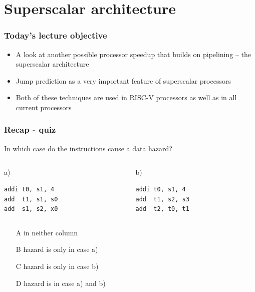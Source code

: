 \documentclass{beamer}
\subtitle{Lecture 06. Superscalar architecture\\a\\jump predictors}
\author{Pavel Píša \phantom{xxxxxxxxx} Petr Štěpán \\ \small\texttt{pisa@fel.cvut.cz}\phantom{xxxx}\small\texttt{stepan@fel.cvut.cz}}
\begin{document}
\maketitle

\section{Superscalar architecture}

\begin{frame}
\frametitle{Today's lecture objective}

\begin{itemize}
 \item A look at another possible processor speedup that builds on pipelining -- the superscalar architecture
 \item Jump prediction as a very important feature of superscalar processors
 \item Both of these techniques are used in RISC-V processors as well as in all current processors
\end{itemize}

\end{frame}

\begin{frame}[fragile]
\frametitle{Recap - quiz}

In which case do the instructions cause a data hazard?

\begin{columns}[T]
\begin{column}{0.40\textwidth}
\phantom{xxxxx}a)

\begin{verbatim}
addi t0, s1, 4
add  t1, s1, s0
add  s1, s2, x0
\end{verbatim}
\end{column}
\begin{column}{0.40\textwidth}
\phantom{xxxxx}b)

\begin{verbatim}
addi t0, s1, 4
add  t1, s2, s3
add  t2, t0, t1
\end{verbatim}
\end{column}
\end{columns}
\bigskip
\begin{itemize}
 \item[A] in neither column
 \item[B] hazard is only in case a)
 \item[C] hazard is only in case b)
 \item[D] hazard is in case a) and b)
\end{itemize}

\end{frame}
\end{document}
